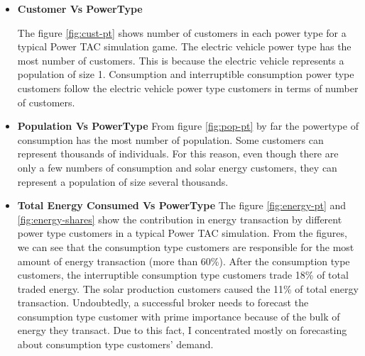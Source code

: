 \begin{itemize}
\item \textbf{Customer Vs PowerType}

The figure \ref{fig:cust-pt} shows number of customers in each power type for a typical Power TAC simulation game. The electric vehicle power type has the most number of customers. This is because the electric vehicle represents a population of size 1. Consumption and interruptible consumption power type customers follow the electric vehicle power type customers in terms of number of customers. 

\item \textbf{Population Vs PowerType}
From figure \ref{fig:pop-pt} by far the powertype of consumption has the most number of population. Some customers can represent thousands of individuals. For this reason, even though there are only a few numbers of consumption and solar energy customers, they can represent a population of size several thousands. 

\item \textbf{Total Energy Consumed Vs PowerType}
The figure \ref{fig:energy-pt} and \ref{fig:energy-shares} show the contribution in energy transaction by different power type customers in a typical Power TAC simulation. From the figures, we can see that the consumption type customers are responsible for the most amount of energy transaction (more than 60\%). After the consumption type customers, the interruptible consumption type customers trade 18\% of total traded energy. The solar production customers caused the 11\% of total energy transaction. Undoubtedly, a successful broker needs to forecast the consumption type customer with prime importance because of the bulk of energy they transact. Due to this fact, I concentrated mostly on forecasting about consumption type customers' demand.



\end{itemize}
